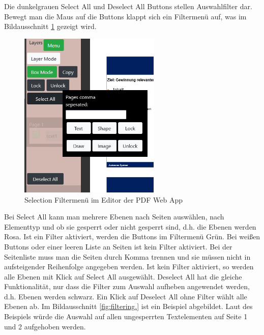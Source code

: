 Die dunkelgrauen Select All und Deselect All Buttons stellen Auswahlfilter dar. Bewegt man die Maus auf die Buttons klappt sich ein Filtermenü auf, was im Bildausschnitt \ref{fig:filtermenu} gezeigt wird. 

\begin{figure}[!htbp]
	\centering
	\includegraphics[width=0.6\textwidth]{"images/filtermenu.png"}
	\caption{Selection Filtermenü im Editor der PDF Web App}
	\label{fig:filtermenu}
\end{figure}

Bei Select All kann man mehrere Ebenen nach Seiten auswählen, nach Elementtyp und ob sie gesperrt oder nicht gesperrt sind, d.h. die Ebenen werden Rosa. Ist ein Filter aktiviert, werden die Buttons im Filtermenü Grün. Bei weißen Buttons oder einer leeren Liste an Seiten ist kein Filter aktiviert. Bei der Seitenliste muss man die Seiten durch Komma trennen und sie müssen nicht in aufsteigender Reihenfolge angegeben werden. Ist kein Filter aktiviert, so werden alle Ebenen mit Klick auf Select All ausgewählt. Deselect All hat die gleiche Funktionalität, nur dass die Filter zum Auswahl aufheben angewendet werden, d.h. Ebenen werden schwarz. Ein Klick auf Deselect All ohne Filter wählt alle Ebenen ab. Im Bildausschnitt \ref{fig:filtering.} ist ein Beispiel abgebildet. Laut des Beispiels würde die Auswahl auf allen ungesperrten Textelementen auf Seite 1 und 2 aufgehoben werden. 


